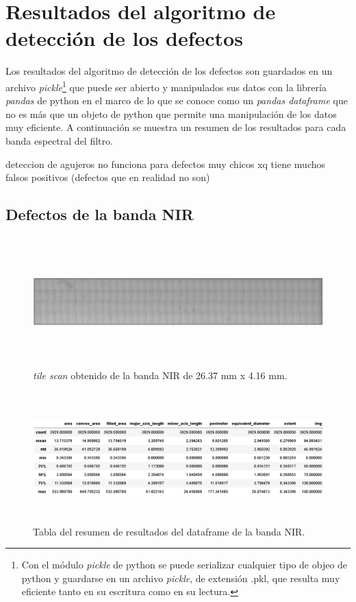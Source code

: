 \singlespacing
\section{Resultados del algoritmo de detección de los defectos}


\hspace{0.5cm}Los resultados del algoritmo de detección de los defectos son guardados en un archivo \textit{pickle}\footnote{Con el módulo \textit{pickle} de python se puede serializar cualquier tipo de objeo de python y guardarse en un archivo \textit{pickle}, de extensión .pkl, que resulta muy eficiente tanto en su escritura como en su lectura.} que puede ser abierto y manipulados sus datos con la librería \textit{pandas} de python en el marco de lo que se conoce como un \textit{pandas dataframe} que no es más que un objeto de python que permite una manipulación de los datos muy eficiente. A continuación se muestra un resumen de los resultados para cada banda espectral del filtro.


deteccion de agujeros no funciona para defectos muy chicos xq tiene muchos falsos positivos (defectos que en realidad no son)
\singlespacing
\subsection{Defectos de la banda NIR}


\begin{figure}[H]
	\centering
	\includegraphics[width=1.0\textwidth,height= 5.0cm]{Figs/resultados_defectos/banda_nir.png}
	\caption{\textit{tile scan} obtenido de la banda NIR de 26.37 mm x 4.16 mm.}
	\label{fig:bgcel}
\end{figure}


\begin{figure}[H]
	\centering
	\includegraphics[width=1.0\textwidth,height= 5.0cm]{Figs/resultados_defectos/tabla_nir.png}
	\caption{Tabla del resumen de resultados del dataframe de la banda NIR.}
	\label{fig:bgcel}
\end{figure}

